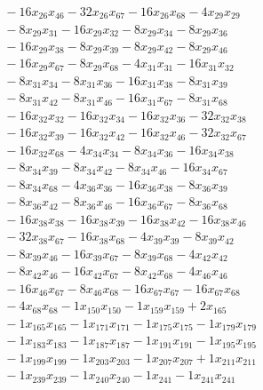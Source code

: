 \[\begin{aligned}
 &\quad - 16 x_{26} x_{46} - 32 x_{26} x_{67} - 16 x_{26} x_{68} - 4 x_{29} x_{29} \\
 &\quad - 8 x_{29} x_{31} - 16 x_{29} x_{32} - 8 x_{29} x_{34} - 8 x_{29} x_{36} \\
 &\quad - 16 x_{29} x_{38} - 8 x_{29} x_{39} - 8 x_{29} x_{42} - 8 x_{29} x_{46} \\
 &\quad - 16 x_{29} x_{67} - 8 x_{29} x_{68} - 4 x_{31} x_{31} - 16 x_{31} x_{32} \\
 &\quad - 8 x_{31} x_{34} - 8 x_{31} x_{36} - 16 x_{31} x_{38} - 8 x_{31} x_{39} \\
 &\quad - 8 x_{31} x_{42} - 8 x_{31} x_{46} - 16 x_{31} x_{67} - 8 x_{31} x_{68} \\
 &\quad - 16 x_{32} x_{32} - 16 x_{32} x_{34} - 16 x_{32} x_{36} - 32 x_{32} x_{38} \\
 &\quad - 16 x_{32} x_{39} - 16 x_{32} x_{42} - 16 x_{32} x_{46} - 32 x_{32} x_{67} \\
 &\quad - 16 x_{32} x_{68} - 4 x_{34} x_{34} - 8 x_{34} x_{36} - 16 x_{34} x_{38} \\
 &\quad - 8 x_{34} x_{39} - 8 x_{34} x_{42} - 8 x_{34} x_{46} - 16 x_{34} x_{67} \\
 &\quad - 8 x_{34} x_{68} - 4 x_{36} x_{36} - 16 x_{36} x_{38} - 8 x_{36} x_{39} \\
 &\quad - 8 x_{36} x_{42} - 8 x_{36} x_{46} - 16 x_{36} x_{67} - 8 x_{36} x_{68} \\
 &\quad - 16 x_{38} x_{38} - 16 x_{38} x_{39} - 16 x_{38} x_{42} - 16 x_{38} x_{46} \\
 &\quad - 32 x_{38} x_{67} - 16 x_{38} x_{68} - 4 x_{39} x_{39} - 8 x_{39} x_{42} \\
 &\quad - 8 x_{39} x_{46} - 16 x_{39} x_{67} - 8 x_{39} x_{68} - 4 x_{42} x_{42} \\
 &\quad - 8 x_{42} x_{46} - 16 x_{42} x_{67} - 8 x_{42} x_{68} - 4 x_{46} x_{46} \\
 &\quad - 16 x_{46} x_{67} - 8 x_{46} x_{68} - 16 x_{67} x_{67} - 16 x_{67} x_{68} \\
 &\quad - 4 x_{68} x_{68} - 1 x_{150} x_{150} - 1 x_{159} x_{159} + 2 x_{165} \\
 &\quad - 1 x_{165} x_{165} - 1 x_{171} x_{171} - 1 x_{175} x_{175} - 1 x_{179} x_{179} \\
 &\quad - 1 x_{183} x_{183} - 1 x_{187} x_{187} - 1 x_{191} x_{191} - 1 x_{195} x_{195} \\
 &\quad - 1 x_{199} x_{199} - 1 x_{203} x_{203} - 1 x_{207} x_{207} + 1 x_{211} x_{211} \\
 &\quad - 1 x_{239} x_{239} - 1 x_{240} x_{240} - 1 x_{241} - 1 x_{241} x_{241}
\end{aligned}\]
